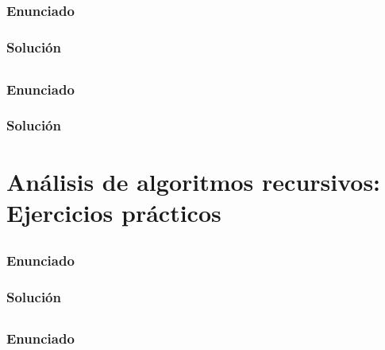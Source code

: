 \subsection{}\label{ej1-1-46}

\subsubsection{Enunciado}

\subsubsection{Solución}

\subsection{}\label{ej1-1-47}

\subsubsection{Enunciado}

\subsubsection{Solución}

\section{Análisis de algoritmos recursivos: Ejercicios prácticos}

\subsection{}\label{ej1-1-48}

\subsubsection{Enunciado}

\subsubsection{Solución}

\subsection{}\label{ej1-1-49}

\subsubsection{Enunciado}

